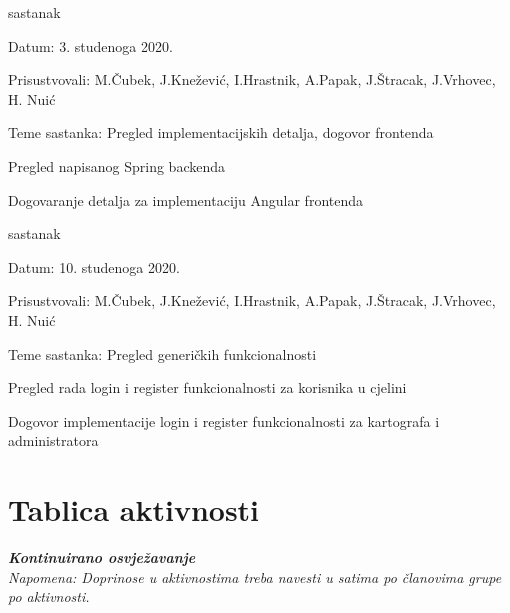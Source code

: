 \begin{packed_enum}
			\item  sastanak
			\item[] \begin{packed_item}
				\item Datum: 3. studenoga 2020.
				\item Prisustvovali: M.Čubek, J.Knežević, I.Hrastnik, A.Papak, J.Štracak, J.Vrhovec, H. Nuić
				\item Teme sastanka: Pregled implementacijskih detalja, dogovor frontenda
				\begin{packed_item}
					\item Pregled napisanog Spring backenda
					\item Dogovaranje detalja za implementaciju Angular frontenda
				\end{packed_item}
			\end{packed_item}
		
			\item  sastanak
			\item[] \begin{packed_item}
				\item Datum: 10. studenoga 2020.
				\item Prisustvovali: M.Čubek, J.Knežević, I.Hrastnik, A.Papak, J.Štracak, J.Vrhovec, H. Nuić
				\item Teme sastanka: Pregled generičkih funkcionalnosti
				\begin{packed_item}
					\item Pregled rada login i register funkcionalnosti za korisnika u cjelini
					\item Dogovor implementacije login i register funkcionalnosti za kartografa i administratora
				\end{packed_item}
			\end{packed_item}
					
			
		\end{packed_enum}
		
		\eject
		\section*{Tablica aktivnosti}
		
			\textbf{\textit{Kontinuirano osvježavanje}}\\
			
			 \textit{Napomena: Doprinose u aktivnostima treba navesti u satima po članovima grupe po aktivnosti.}
					
						
			
